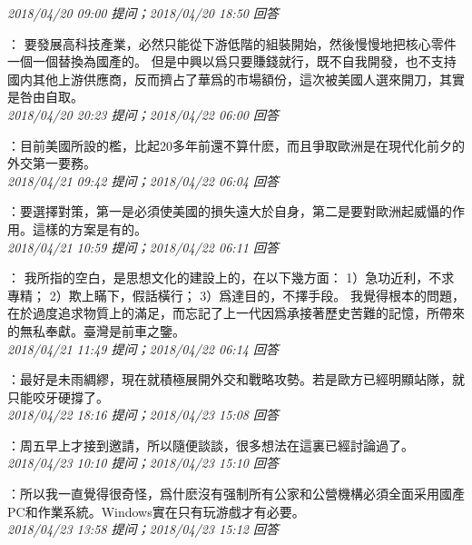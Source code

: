 \documentclass[twocolumn]{ctexart}
\begin{document}
\textit{\hfill\noindent\small 2018/04/20 09:00 提问；2018/04/20 18:50 回答}

：
要發展高科技產業，必然只能從下游低階的組裝開始，然後慢慢地把核心零件一個一個替換為國產的。
但是中興以爲只要賺錢就行，既不自我開發，也不支持國内其他上游供應商，反而擠占了華爲的市場額份，這次被美國人選來開刀，其實是咎由自取。
\\

\textit{\hfill\noindent\small 2018/04/20 20:23 提问；2018/04/22 06:00 回答}

：目前美國所設的檻，比起20多年前還不算什麽，而且爭取歐洲是在現代化前夕的外交第一要務。
\\

\textit{\hfill\noindent\small 2018/04/21 09:42 提问；2018/04/22 06:04 回答}

：要選擇對策，第一是必須使美國的損失遠大於自身，第二是要對歐洲起威懾的作用。這樣的方案是有的。
\\

\textit{\hfill\noindent\small 2018/04/21 10:59 提问；2018/04/22 06:11 回答}

：
我所指的空白，是思想文化的建設上的，在以下幾方面：
1）急功近利，不求專精；
2）欺上瞞下，假話橫行；
3）爲達目的，不擇手段。
我覺得根本的問題，在於過度追求物質上的滿足，而忘記了上一代因爲承接著歷史苦難的記憶，所帶來的無私奉獻。臺灣是前車之鑒。
\\

\textit{\hfill\noindent\small 2018/04/21 11:49 提问；2018/04/22 06:14 回答}

：最好是未雨綢繆，現在就積極展開外交和戰略攻勢。若是歐方已經明顯站隊，就只能咬牙硬撐了。
\\

\textit{\hfill\noindent\small 2018/04/22 18:16 提问；2018/04/23 15:08 回答}

：周五早上才接到邀請，所以隨便談談，很多想法在這裏已經討論過了。
\\

\textit{\hfill\noindent\small 2018/04/23 10:10 提问；2018/04/23 15:10 回答}

：所以我一直覺得很奇怪，爲什麽沒有强制所有公家和公營機構必須全面采用國產PC和作業系統。Windows實在只有玩游戲才有必要。
\\

\textit{\hfill\noindent\small 2018/04/23 13:58 提问；2018/04/23 15:12 回答}
\end{document}
